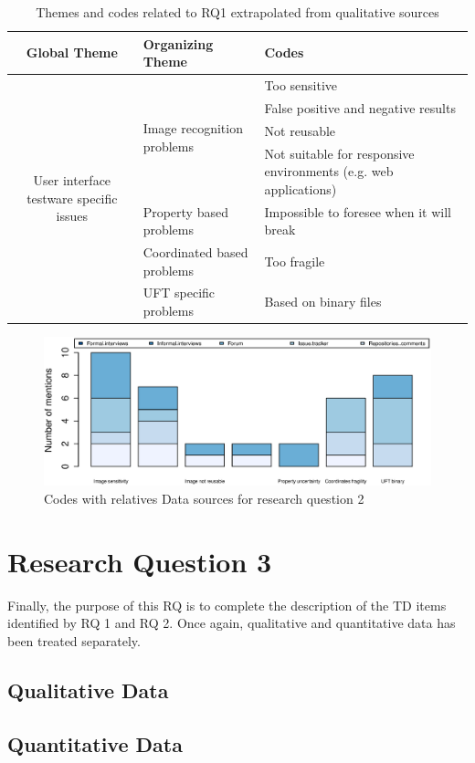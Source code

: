   
\begin{table}
\renewcommand{\arraystretch}{1.5}
\centering
\begin{tabular}{ c p{4.3cm} p{4.6cm}}
    
    \hline       
    {\large Global Theme} & {\large Organizing Theme} & {\large Codes}\\
    \hline
    
    \multirow{7}{*}{\parbox[b]{4.3cm}{
        User interface testware specific issues
    }
    } & \multirow{4}{*}{\parbox[c]{4.3cm}{Image recognition problems}}
        & Too sensitive \\
        & & False positive and negative results\\
        & & Not reusable\\ 
        & & Not suitable for responsive environments (e.g. web applications)\\ \cline{2-3}
        
    & Property based problems & Impossible to foresee when it will break\\ \cline{2-3}
        
    & Coordinated based problems  & Too fragile\\ \cline{2-3}
        
    & UFT specific problems & Based on binary files\\
        
    \hline
\end{tabular}
\caption{Themes and codes related to RQ1 extrapolated from qualitative sources}
\label{tab:themes_rq2}
\end{table}

\begin{figure}[!htbp]
    \centering
    \includegraphics[width=\textwidth,keepaspectratio]{figure/results/rq2/sources.eps}
    \caption{Codes with relatives Data sources for research question 2}
    \label{fig:rq2_sources}
\end{figure}


\section{Research Question 3}

Finally, the purpose of this RQ is to complete the description of the TD items identified by RQ 1 and RQ 2. Once again, qualitative and quantitative data has been treated separately.

\subsection{Qualitative Data}
    

\subsection{Quantitative Data}
    

